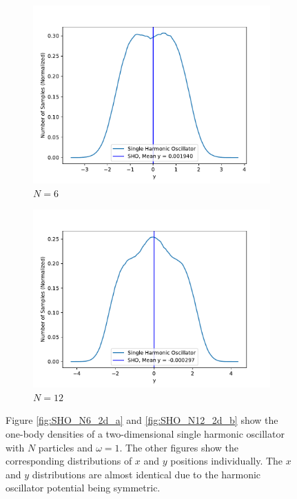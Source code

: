 \documentclass[../main.tex]{subfiles}
\begin{document}
\begin{figure}
\medskip
\begin{subfigure}{0.48\textwidth}
\includegraphics[width=\linewidth]{figures/densitySHO/density_SHO_N6_Omega1_2d_y}
\caption{$N=6$} \label{fig:SHO_N6_2d_y_e}
\end{subfigure}\hspace*{\fill}
\begin{subfigure}{0.48\textwidth}
\includegraphics[width=\linewidth]{figures/densitySHO/density_SHO_N12_Omega1_2d_y}
\caption{$N=12$} \label{fig:SHO_N12_2d_y_f}
\end{subfigure}

\caption{Figure \ref{fig:SHO_N6_2d_a} and \ref{fig:SHO_N12_2d_b} show the one-body densities of a two-dimensional single harmonic oscillator with $N$ particles and $\omega=1$. The other figures show the corresponding distributions of $x$ and $y$ positions individually. The $x$ and $y$ distributions are almost identical due to the harmonic oscillator potential being symmetric.} \label{fig:SHO_density2d}
\end{figure}
\end{document}
